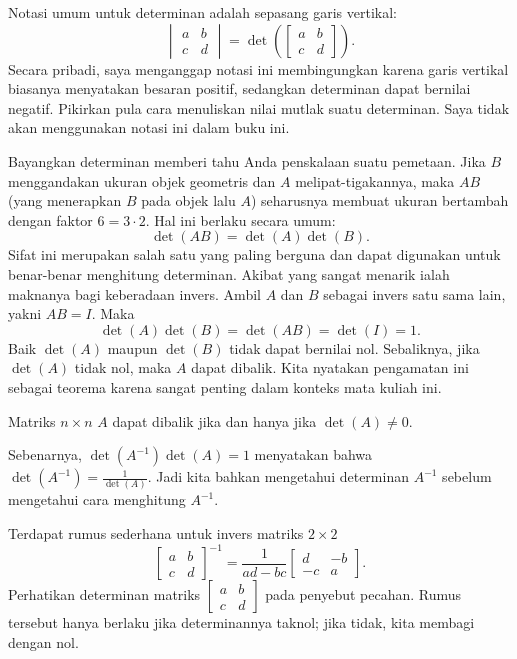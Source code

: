 Notasi umum untuk determinan adalah sepasang garis
vertikal:
\begin{equation*}
\begin{vmatrix}
a & b \\
c & d
\end{vmatrix}
=
\det \left(
\begin{bmatrix}
a & b \\
c & d
\end{bmatrix}
\right) .
\end{equation*}
Secara pribadi, saya menganggap notasi ini membingungkan karena garis vertikal biasanya
menyatakan besaran positif, sedangkan determinan dapat bernilai negatif.  Pikirkan pula
cara menuliskan nilai mutlak suatu determinan.  Saya tidak akan
menggunakan notasi ini dalam buku ini.

\medskip

Bayangkan determinan memberi tahu Anda penskalaan suatu pemetaan.
Jika $B$ menggandakan ukuran objek geometris dan $A$ melipat-tigakannya,
maka $AB$ (yang menerapkan $B$ pada objek lalu $A$) seharusnya membuat ukuran
bertambah dengan faktor $6 = 3 \cdot 2$.  Hal ini berlaku secara umum:
\begin{equation*}
\det(AB) = \det(A)\det(B) .
\end{equation*}
Sifat ini merupakan salah satu yang paling berguna dan dapat digunakan untuk
benar-benar menghitung determinan.  Akibat yang sangat menarik ialah
maknanya bagi keberadaan invers.
Ambil $A$ dan $B$ sebagai invers satu sama lain, yakni $AB=I$.  Maka
\begin{equation*}
\det(A)\det(B) = \det(AB) = \det(I) = 1 .
\end{equation*}
Baik $\det(A)$ maupun $\det(B)$ tidak dapat bernilai nol.
Sebaliknya, jika $\det(A)$ tidak nol, maka $A$
dapat dibalik.
Kita nyatakan pengamatan ini sebagai teorema
karena sangat penting dalam konteks mata kuliah ini.

\begin{theorem}
Matriks $n \times n$ $A$ dapat dibalik jika dan hanya jika $\det (A) \neq 0$.
\end{theorem}

Sebenarnya, $\det(A^{-1}) \det(A) = 1$ menyatakan bahwa $\det(A^{-1}) =
\frac{1}{\det(A)}$.  Jadi kita bahkan mengetahui determinan $A^{-1}$
sebelum mengetahui cara menghitung $A^{-1}$.

Terdapat rumus sederhana untuk invers matriks $2 \times 2$
\begin{equation*}
\begin{bmatrix}
a & b \\
c & d
\end{bmatrix}^{-1}
=
\frac{1}{ad-bc}
\begin{bmatrix}
d & -b \\
-c & a
\end{bmatrix} .
\end{equation*}
Perhatikan determinan matriks
$[\begin{smallmatrix}a&b\\c&d\end{smallmatrix}]$
pada penyebut pecahan.
Rumus tersebut hanya berlaku jika determinannya taknol; jika tidak, kita
membagi dengan nol.

